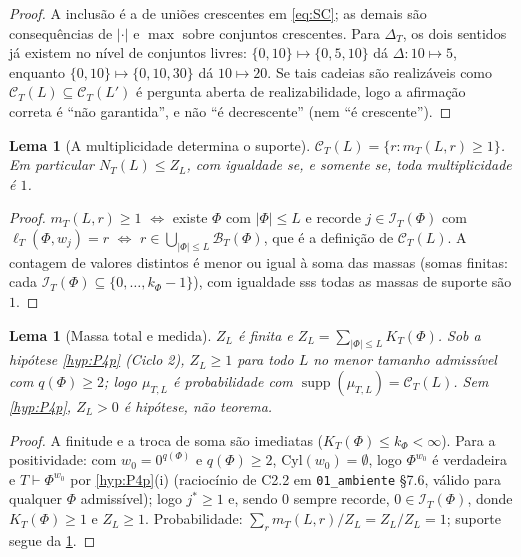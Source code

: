 \documentclass[11pt,a4paper]{article}
\newtheorem{lemma}[theorem]{Lema}
\theoremstyle{definition}
\theoremstyle{remark}
\begin{document}
\begin{proof}
A inclusão é a de uniões crescentes em \eqref{eq:SC}; as demais são
consequências de $|\cdot|$ e $\max$ sobre conjuntos crescentes. Para
$\Delta_T$, os dois sentidos já existem no nível de conjuntos livres:
$\{0,10\} \mapsto \{0,5,10\}$ dá $\Delta: 10 \mapsto 5$, enquanto
$\{0,10\} \mapsto \{0,10,30\}$ dá $10 \mapsto 20$. Se tais cadeias são
realizáveis como $\mathcal{C}_T(L) \subseteq \mathcal{C}_T(L')$ é
pergunta aberta de realizabilidade, logo a afirmação correta é ``não
garantida'', e não ``é decrescente'' (nem ``é crescente'').
\end{proof}

\begin{lemma}[A multiplicidade determina o suporte]\label{lem:mult-suporte}
$\mathcal{C}_T(L) = \{r : m_T(L,r) \geq 1\}$. Em particular
$N_T(L) \leq Z_L$, com igualdade se, e somente se, toda multiplicidade
é $1$.
\end{lemma}

\begin{proof}
$m_T(L,r) \geq 1$ $\iff$ existe $\Phi$ com $|\Phi| \leq L$ e recorde
$j \in \mathcal{I}_T(\Phi)$ com $\ell_T(\Phi,w_j) = r$ $\iff$ $r \in
\bigcup_{|\Phi| \leq L} \mathcal{B}_T(\Phi)$, que é a definição de
$\mathcal{C}_T(L)$. A contagem de valores distintos é menor ou igual à
soma das massas (somas finitas: cada $\mathcal{I}_T(\Phi) \subseteq
\{0,\dots,k_\Phi-1\}$), com igualdade sss todas as massas de suporte
são $1$.
\end{proof}

\begin{lemma}[Massa total e medida]\label{lem:massa}
$Z_L$ é finita e $Z_L = \sum_{|\Phi| \leq L} K_T(\Phi)$. Sob a
hipótese \cref{hyp:P4p} (Ciclo 2), $Z_L \geq 1$ para todo $L$ no
menor tamanho admissível com $q(\Phi) \geq 2$; logo $\mu_{T,L}$ é
probabilidade com $\operatorname{supp}(\mu_{T,L}) = \mathcal{C}_T(L)$.
Sem \cref{hyp:P4p}, $Z_L > 0$ é \emph{hipótese}, não teorema.
\end{lemma}

\begin{proof}
A finitude e a troca de soma são imediatas ($K_T(\Phi) \leq k_\Phi <
\infty$). Para a positividade: com $w_0 = 0^{q(\Phi)}$ e $q(\Phi)
\geq 2$, $\mathrm{Cyl}(w_0) = \emptyset$, logo $\Phi^{w_0}$ é verdadeira
e $T \vdash \Phi^{w_0}$ por \cref{hyp:P4p}(i) (raciocínio de C2.2 em
\texttt{01\_ambiente} §7.6, válido para qualquer $\Phi$ admissível);
logo $j^{*} \geq 1$ e, sendo $0$ sempre recorde, $0 \in
\mathcal{I}_T(\Phi)$, donde $K_T(\Phi) \geq 1$ e $Z_L \geq 1$.
Probabilidade: $\sum_r m_T(L,r)/Z_L = Z_L/Z_L = 1$; suporte segue da
\cref{lem:mult-suporte}.
\end{proof}
\end{document}
